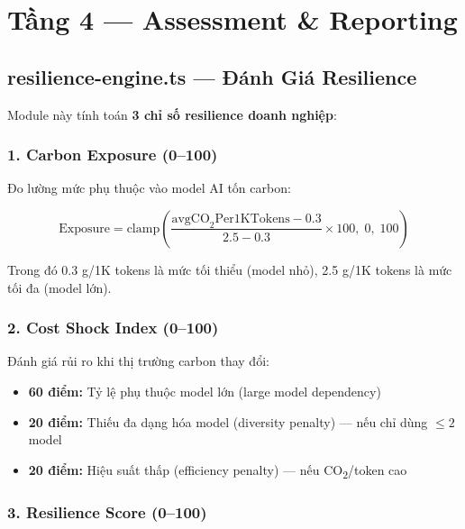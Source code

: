 \documentclass[12pt,a4paper]{article}
\begin{document}
\section{Tầng 4 — Assessment \& Reporting}

\subsection{resilience-engine.ts — Đánh Giá Resilience}

Module này tính toán \textbf{3 chỉ số resilience doanh nghiệp}:

\subsubsection{1. Carbon Exposure (0--100)}

Đo lường mức phụ thuộc vào model AI tốn carbon:

\begin{equation}
    \text{Exposure} = \text{clamp}\left(\frac{\text{avgCO}_2\text{Per1KTokens} - 0.3}{2.5 - 0.3} \times 100, \; 0, \; 100\right)
\end{equation}

Trong đó 0.3 g/1K tokens là mức tối thiểu (model nhỏ), 2.5 g/1K tokens là mức tối đa (model lớn).

\subsubsection{2. Cost Shock Index (0--100)}

Đánh giá rủi ro khi thị trường carbon thay đổi:

\begin{itemize}
    \item \textbf{60 điểm:} Tỷ lệ phụ thuộc model lớn (large model dependency)
    \item \textbf{20 điểm:} Thiếu đa dạng hóa model (diversity penalty) — nếu chỉ dùng $\leq 2$ model
    \item \textbf{20 điểm:} Hiệu suất thấp (efficiency penalty) — nếu CO\textsubscript{2}/token cao
\end{itemize}

\subsubsection{3. Resilience Score (0--100)}
\end{document}
